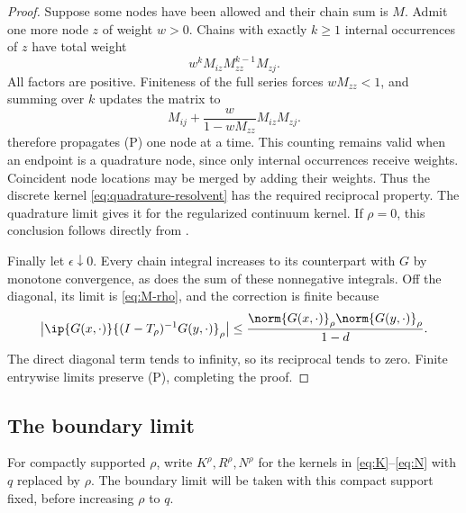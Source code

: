 \begin{proof}
Suppose some nodes have been allowed and their chain sum is $M$. Admit one more node $z$ of weight $w>0$. Chains with exactly $k\ge1$ internal occurrences of $z$ have total weight
\[
w^kM_{iz}M_{zz}^{k-1}M_{zj}.
\]
All factors are positive. Finiteness of the full series forces $wM_{zz}<1$, and summing over $k$ updates the matrix to
\begin{equation}\label{eq:elimination}
M_{ij}+\frac{w}{1-wM_{zz}}M_{iz}M_{zj}.
\end{equation}
 therefore propagates \textup{(P)} one node at a time. This counting remains valid when an endpoint is a quadrature node, since only internal occurrences receive weights. Coincident node locations may be merged by adding their weights. Thus the discrete kernel \eqref{eq:quadrature-resolvent} has the required reciprocal property. The quadrature limit gives it for the regularized continuum kernel. If $\rho=0$, this conclusion follows directly from .

Finally let $\epsilon\downarrow0$. Every chain integral increases to its counterpart with $G$ by monotone convergence, as does the sum of these nonnegative integrals. Off the diagonal, its limit is \eqref{eq:M-rho}, and the correction is finite because
\[
\big|\ip{G(x,\cdot)}{(I-T_\rho)^{-1}G(y,\cdot)}_\rho\big|
\le\frac{\norm{G(x,\cdot)}_\rho\norm{G(y,\cdot)}_\rho}{1-d}.
\]
The direct diagonal term tends to infinity, so its reciprocal tends to zero. Finite entrywise limits preserve \textup{(P)}, completing the proof.
\end{proof}

\subsection{The boundary limit}

For compactly supported $\rho$, write $K^\rho,R^\rho,N^\rho$ for the kernels in \eqref{eq:K}--\eqref{eq:N} with $q$ replaced by $\rho$. The boundary limit will be taken with this compact support fixed, before increasing $\rho$ to $q$.

